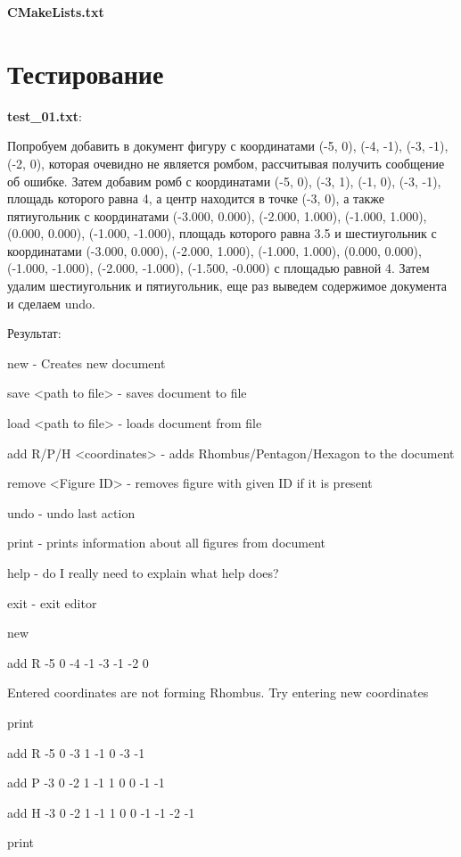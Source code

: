 \documentclass[a4paper, 12pt]{article}
\begin{document}
\vspace{3ex}
\textbf{\large{CMakeLists.txt}}

\newpage
\section{Тестирование}
\vspace{3ex}

\textbf{test\_01.txt}:

Попробуем добавить в документ фигуру с координатами (-5, 0), (-4, -1), (-3, -1), (-2, 0), которая очевидно не является ромбом, рассчитывая получить сообщение об ошибке. Затем добавим ромб с координатами (-5, 0), (-3, 1), (-1, 0), (-3, -1), площадь которого равна 4, а центр находится в точке (-3, 0), а также пятиугольник с координатами (-3.000, 0.000), (-2.000, 1.000), (-1.000, 1.000), (0.000, 0.000), (-1.000, -1.000), площадь которого равна 3.5 и шестиугольник с координатами
(-3.000, 0.000), (-2.000, 1.000), (-1.000, 1.000), (0.000, 0.000), (-1.000, -1.000), (-2.000, -1.000), (-1.500, -0.000) с площадью равной 4. Затем удалим шестиугольник и пятиугольник, еще раз выведем содержимое документа и сделаем undo.

Результат:

new - Creates new document

save <path to file> - saves document to file

load <path to file> - loads document from file

add R/P/H <coordinates> - adds Rhombus/Pentagon/Hexagon to the document

remove <Figure ID> - removes figure with given ID if it is present

undo - undo last action

print - prints information about all figures from document

help - do I really need to explain what help does?

exit - exit editor

new

add R -5 0 -4 -1 -3 -1 -2 0

Entered coordinates are not forming Rhombus. Try entering new coordinates

print

add R -5 0 -3 1 -1 0 -3 -1

add P -3 0 -2 1 -1 1 0 0 -1 -1

add H -3 0 -2 1 -1 1 0 0 -1 -1 -2 -1 

print
\end{document}

